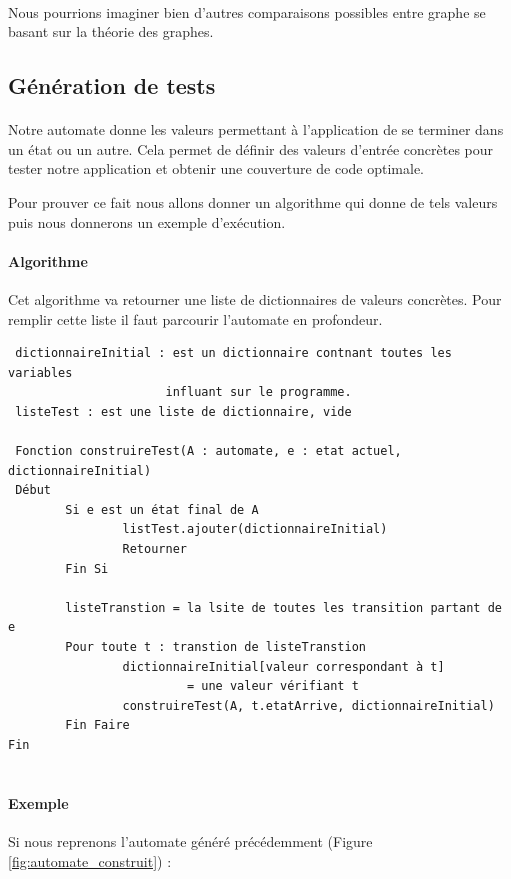 \paragraph{}
Nous pourrions imaginer bien d'autres comparaisons possibles entre graphe se 
basant sur la théorie des graphes.

\subsection{Génération de tests}

\paragraph{}
Notre automate donne les valeurs permettant à l'application de se terminer 
dans un état ou un autre. Cela permet de définir des valeurs d'entrée concrètes 
pour tester notre application et obtenir une couverture de code optimale.


Pour prouver ce fait nous allons donner un algorithme qui donne de tels 
valeurs puis nous donnerons un exemple d'exécution. 

\paragraph{Algorithme}
Cet algorithme va retourner une liste de dictionnaires de valeurs concrètes. 
Pour remplir cette liste il faut parcourir l'automate en profondeur.

\begin{verbatim}
 dictionnaireInitial : est un dictionnaire contnant toutes les variables
                      influant sur le programme.
 listeTest : est une liste de dictionnaire, vide
 
 Fonction construireTest(A : automate, e : etat actuel, dictionnaireInitial)
 Début
        Si e est un état final de A
                listTest.ajouter(dictionnaireInitial)
                Retourner
        Fin Si
        
        listeTranstion = la lsite de toutes les transition partant de e
        Pour toute t : transtion de listeTranstion
                dictionnaireInitial[valeur correspondant à t] 
                         = une valeur vérifiant t
                construireTest(A, t.etatArrive, dictionnaireInitial)
        Fin Faire
Fin
        
\end{verbatim}

\paragraph{Exemple}
Si nous reprenons l'automate généré précédemment (Figure 
\ref{fig:automate_construit}) :

